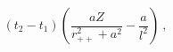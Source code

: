 \begin{equation}
 (t_2-t_1) \left(\frac{aZ}{r_{++}^2+a^2} - \frac{a}{l^2}  \right) \ ,
\label{a1}
\end{equation}

